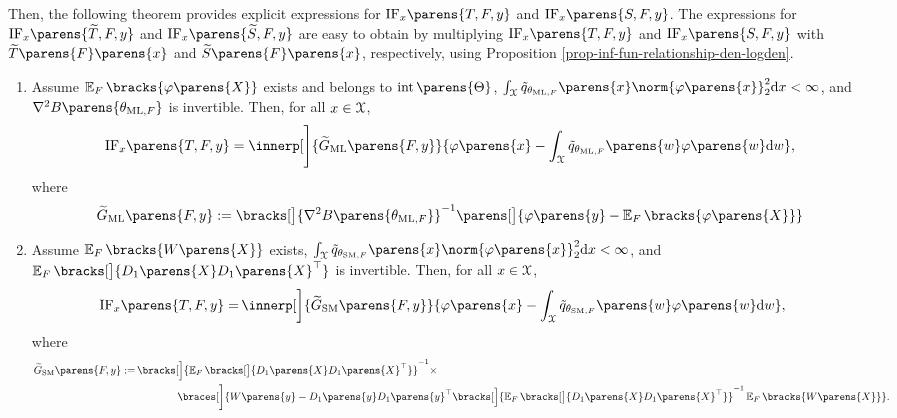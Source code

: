 Then, the following theorem provides explicit expressions for $\mathrm{IF}_x \parens{T, F, y}$ and $\mathrm{IF}_x \parens{S, F, y}$. The expressions for $\mathrm{IF}_x \parens{\widetilde{T}, F, y}$ and $\mathrm{IF}_x \parens{\widetilde{S}, F, y}$ are easy to obtain by multiplying $\mathrm{IF}_x \parens{T, F, y}$ and $\mathrm{IF}_x \parens{S, F, y}$ with $\widetilde{T} \parens{F} \parens{x}$ and $\widetilde{S} \parens{F} \parens{x}$, respectively, using Proposition \ref{prop-inf-fun-relationship-den-logden}. 

\begin{theorem}\label{theorem-inf-fun-ml-sm-fin-dim-exp-fam}
	\leavevmode
	\begin{enumerate}[label=(\alph*)]
		\item \label{theorem-inf-fun-ml-sm-fin-dim-exp-fam-a} Assume $\E_F \bracks{\varphi \parens{X}}$ exists and belongs to $\interior \parens{\Theta}$, $\int_{\calX} \tilde{q}_{\theta_{\ML, F}} \parens{x} \norm{\varphi \parens{x}}_2^2 \diff x < \infty$, and $\nabla^2 B \parens{\theta_{\ML, F}}$ is invertible. Then, for all $x \in \mathcal{X}$, 
		\begin{align}\label{eq-inffun-ml-fin-dim-exp-fam}
			\mathrm{IF}_x \parens{T, F, y} = \innerp[\Bigg]{ \widetilde{G}_{\ML} \parens{F, y} }{ \varphi \parens{x} - \int_{\calX} \tilde{q}_{\theta_{\ML, F}} \parens{w} \varphi \parens{w} \diff w }, 
		\end{align}
		where 
		\begin{align*}
			\widetilde{G}_{\ML} \parens{F, y} := \bracks[\big]{\nabla^2 B \parens{\theta_{\ML, F} }}^{-1} \parens[\big]{\varphi \parens{y} - \E_{F} \bracks{\varphi \parens{X}}}
		\end{align*}
		
		\item \label{theorem-inf-fun-ml-sm-fin-dim-exp-fam-b} Assume $\E_F \bracks{W \parens{X}}$ exists, $\int_{\calX} \tilde{q}_{\theta_{\SM, F}} \parens{x} \norm{\varphi \parens{x}}_2^2 \diff x < \infty$, and $\E_F \bracks[\big]{D_1 \parens{X} D_1 \parens{X}^\top}$ is invertible. Then, for all $x \in \mathcal{X}$, 
		\begin{align}\label{eq-inffun-sm-fin-dim-exp-fam}
			\mathrm{IF}_x \parens{T, F, y} = & \, \innerp[\bigg]{ \widetilde{G}_{\SM} \parens{F, y}}{ \varphi \parens{x} - \int_{\calX} \tilde{q}_{\theta_{\SM, F}} \parens{w} \varphi \parens{w} \diff w}, 
		\end{align}
		where 
		\begin{align*}
			\widetilde{G}_{\SM} \parens{F, y} := & \, \bracks[\Big]{\E_F \bracks[\big]{D_1 \parens{X} D_1 \parens{X}^\top} }^{-1} \times \\ 
			& \qquad \qquad  \braces[\bigg]{W  \parens{y} - D_1 \parens{y} D_1 \parens{y}^\top \bracks[\Big]{\E_F \bracks[\big]{D_1 \parens{X} D_1 \parens{X}^\top} }^{-1} \E_F \bracks{W \parens{X}} }. 
		\end{align*}
	\end{enumerate}
\end{theorem}

